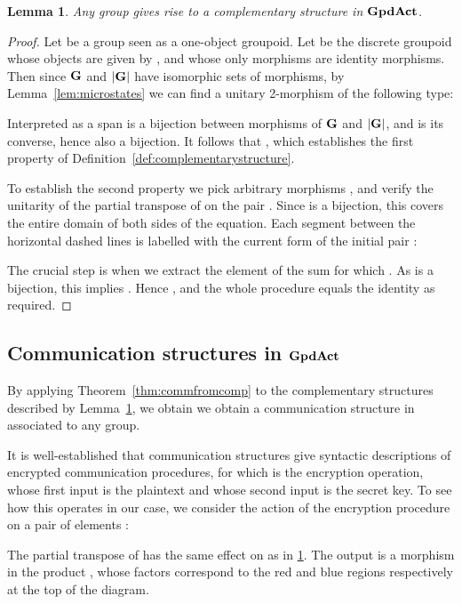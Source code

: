 \documentclass[a4paper,12pt]{article}
\newtheorem{lemma}[theorem]{Lemma}
\theoremstyle{definition}
\newcommand\cat[1]{{\ensuremath{\bf #1}}}
\renewcommand{\-}[0]{\nobreakdash-\hspace{0pt}}
\begin{document}
\begin{lemma}
\label{lem:compingpdact}
Any group  gives rise to a complementary structure in \cat{GpdAct}.
\end{lemma}
\begin{proof}
Let  be a group seen as a one-object groupoid. Let  be the discrete groupoid whose objects are given by , and whose only morphisms are identity morphisms. Then since \cat G and \cat{|G|} have isomorphic sets of morphisms, by Lemma~\ref{lem:microstates} we can find a unitary 2\-morphism  of the following type:


Interpreted as a span  is a bijection between morphisms of \cat{G} and \cat{|G|}, and  is its converse, hence also a bijection. It follows that , which establishes the first property of Definition~\ref{def:complementarystructure}.

To establish the second property we pick arbitrary morphisms , and verify the unitarity of the partial transpose of  on the pair . Since  is a bijection, this covers the entire domain of both sides of the equation. Each segment between the horizontal dashed lines is labelled with the current form of the initial pair :

The crucial step is when we extract the element of the sum  for which . As  is a bijection, this implies . Hence , and the whole procedure equals the identity as required.
\end{proof}

\subsection{Communication structures in \cat{GpdAct}}
\label{sec:concreteencryption}

\noindent
By applying Theorem~\ref{thm:commfromcomp} to the complementary structures described by Lemma~\ref{lem:compingpdact}, we obtain we obtain a communication structure in  associated to any group.

It is well-established that communication structures give syntactic descriptions of encrypted communication procedures, for which  is the encryption operation, whose first input is the plaintext and whose second input is the secret key. To see how this operates in our case, we consider the action of the encryption procedure  on a pair of elements :

The partial transpose of  has the same effect on  as in \ref{lem:compingpdact}. The output  is a morphism in the product , whose factors correspond to the red and blue regions respectively at the top of the diagram.
\end{document}
